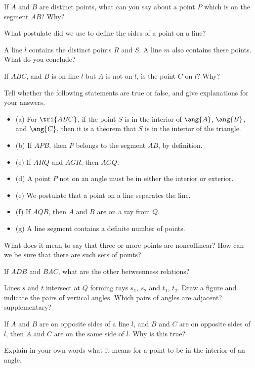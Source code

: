 \documentclass[11pt]{book}
\theoremstyle{bkplain}
\theoremstyle{XIplainnote}
\theoremstyle{bkplain}
\theoremstyle{bkplain}
\begin{document}
\begin{exlist}
\item If $A$ and $B$ are distinct points, what can you say about a point $P$
      which is on the segment $AB$? Why?
\item What postulate did we use to define the sides of a point on a line?
\item A line $l$ contains the distinct points $R$ and $S$. A line $m$ also
      contains these points. What do you conclude?
\item If $ABC$, and $B$ is on line $l$ but $A$ is not on $l$, is the point $C$ on
      $l$? Why?
\item Tell whether the following statements are true or false, and give
      explanations for your answers.
      \begin{itemize}[label=,leftmargin=1.4em,itemsep=1pt,topsep=2pt]
      \item (a) For $\tri{ABC}$, if the point $S$ is in the interior of $\ang{A}$,
            $\ang{B}$, and $\ang{C}$, then it is a theorem that $S$ is in the
            interior of the triangle.
      \item (b) If $APB$, then $P$ belongs to the segment $AB$, by definition.
      \item (c) If $ARQ$ and $AGR$, then $AGQ$.
      \item (d) A point $P$ not on an angle must be in either the interior or
            exterior.
      \item (e) We postulate that a point on a line separates the line.
      \item (f) If $AQB$, then $A$ and $B$ are on a ray from $Q$.
      \item (g) A line segment contains a definite number of points.
      \end{itemize}
\item What does it mean to say that three or more points are noncollinear? How
      can we be sure that there are such sets of points?
\item If $ADB$ and $BAC$, what are the other betweenness relations?
\item Lines $s$ and $t$ intersect at $Q$ forming rays $s_1$, $s_2$ and $t_1$,
      $t_2$. Draw a figure and indicate the pairs of vertical angles. Which pairs
      of angles are adjacent? supplementary?
\item If $A$ and $B$ are on opposite sides of a line $l$, and $B$ and $C$ are on
      opposite sides of $l$, then $A$ and $C$ are on the same side of $l$. Why is
      this true?
\item Explain in your own words what it means for a point to be in the interior
      of an angle.
\end{exlist}
\end{document}
